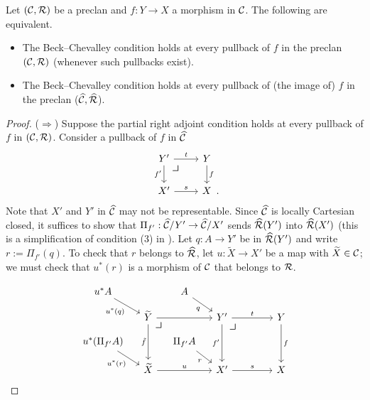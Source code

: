 \begin{lemma}\label{lem:BC-iff-BC-in-presheaves}
  Let $(\mathcal{C},\mathcal{R})$ be a preclan and $f : Y \to X$ a morphism in $\mathcal{C}$.
  The following are equivalent.
  \begin{itemize}
  \item
    The Beck--Chevalley condition holds at every pullback of
    $f$ in the preclan $(\mathcal{C},\mathcal{R})$
    (whenever such pullbacks exist).
  \item 
    The Beck--Chevalley condition holds at every pullback of
    (the image of) $f$ in the preclan ($\widehat{\mathcal{C}},\widehat{\mathcal{R}}$).
  \end{itemize}
\end{lemma}
\begin{proof}
  ($\Rightarrow$)
  Suppose the partial right adjoint condition
  holds at every pullback of $f$ in $(\mathcal{C},\mathcal{R})$.
  Consider a pullback of $f$ in $\widehat{\mathcal{C}}$
  \[
    \begin{tikzcd}
      Y' \ar[r, "t"] \ar[d, "f'"'] \pbcorner & Y \ar[d, "f"] \\
      X' \ar[r, "s"] & X \rlap{\, .}
    \end{tikzcd}
  \]
  Note that $X'$ and $Y'$ in $\widehat{\mathcal{C}}$ may not be representable.
  Since $\widehat{\mathcal{C}}$ is locally Cartesian closed,
  it suffices to show that $\Pi_{f'} : \widehat{\mathcal{C}} / Y' \to \widehat{\mathcal{C}} / X'$
  sends $\widehat{\mathcal{R}}(Y')$ into $\widehat{\mathcal{R}}(X')$
  (this is a simplification of condition (3) in ).
  Let $q : A \to Y'$ be in $\widehat{\mathcal{R}}(Y')$
  and write $r := \Pi_{f'}(q)$.
  To check that $r$ belongs to $\widehat{\mathcal{R}}$,
  let $u : \widetilde X \to X'$ be a map with $\widetilde X \in \mathcal{C}$;
  we must check that $u^*(r)$ is a morphism of $\mathcal{C}$ that belongs to $\mathcal{R}$.

  \[
    \begin{tikzcd}[row sep=small, column sep=small]
      u^* A \ar[rd, "u^*(q)"'] & & A \ar[rd, "q"'] \\
      & \widetilde Y \ar[rr] \ar[dd, "\tilde f"'] \pbcorner & &
      Y' \ar[rr, "t"] \ar[dd, "f'"'] \pbcorner & & Y \ar[dd, "f"] \\
      u^*(\Pi_{f'} A) \ar[rd, "u^*(r)"'] & &
      \Pi_{f'} A \ar[rd, "r"'] & & \hphantom{B} \\
      & \widetilde X \ar[rr, "u"] & &
      X' \ar[rr, "s"] & & X
    \end{tikzcd}
  \]


\end{proof}
